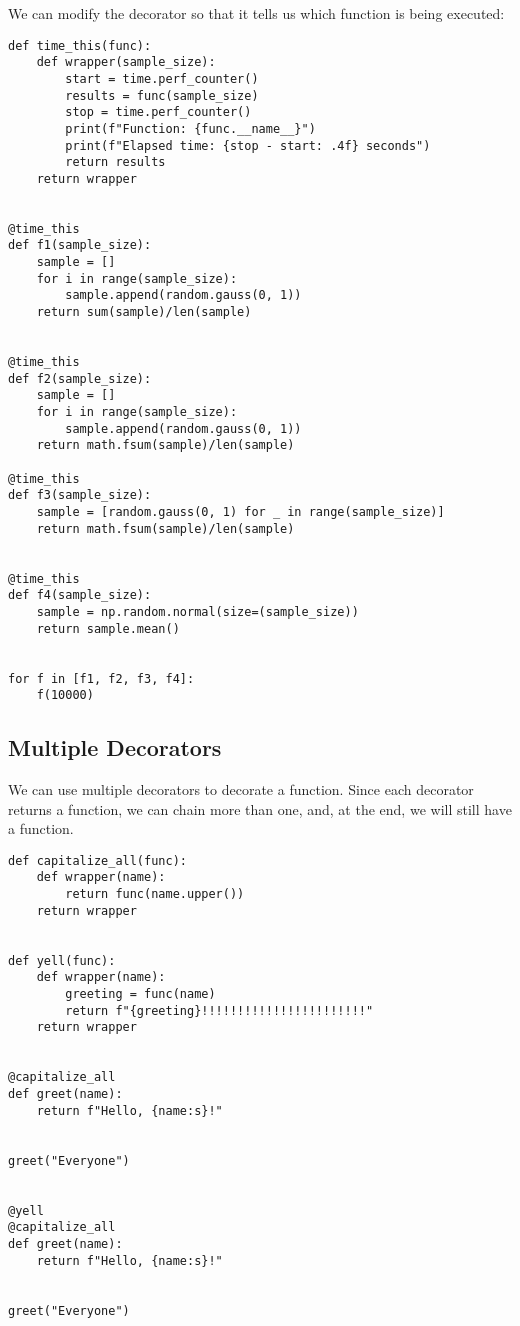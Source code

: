 \documentclass[12pt, a4paper]{article}
\begin{document}
We can modify the decorator so that it tells us which function is being executed:
\lstset{language=jupyter-python,label= ,caption= ,captionpos=b,numbers=none}
\begin{lstlisting}
def time_this(func):
    def wrapper(sample_size):
        start = time.perf_counter()
        results = func(sample_size)
        stop = time.perf_counter()
        print(f"Function: {func.__name__}")
        print(f"Elapsed time: {stop - start: .4f} seconds")
        return results
    return wrapper


@time_this
def f1(sample_size):
    sample = []
    for i in range(sample_size):
        sample.append(random.gauss(0, 1))
    return sum(sample)/len(sample)


@time_this
def f2(sample_size):
    sample = []
    for i in range(sample_size):
        sample.append(random.gauss(0, 1))
    return math.fsum(sample)/len(sample)

@time_this
def f3(sample_size):
    sample = [random.gauss(0, 1) for _ in range(sample_size)]
    return math.fsum(sample)/len(sample)


@time_this
def f4(sample_size):
    sample = np.random.normal(size=(sample_size))
    return sample.mean()


for f in [f1, f2, f3, f4]:
    f(10000)
\end{lstlisting}

\subsection{Multiple Decorators}
\label{sec:org75cd743}
We can use multiple decorators to decorate a function.
Since each decorator returns a function, we can chain more than one, and, at the end, we will still have a function.
\lstset{language=jupyter-python,label= ,caption= ,captionpos=b,numbers=none}
\begin{lstlisting}
def capitalize_all(func):
    def wrapper(name):
        return func(name.upper())
    return wrapper


def yell(func):
    def wrapper(name):
        greeting = func(name)
        return f"{greeting}!!!!!!!!!!!!!!!!!!!!!!!"
    return wrapper


@capitalize_all
def greet(name):
    return f"Hello, {name:s}!"


greet("Everyone")


@yell
@capitalize_all
def greet(name):
    return f"Hello, {name:s}!"


greet("Everyone")
\end{lstlisting}
\end{document}
